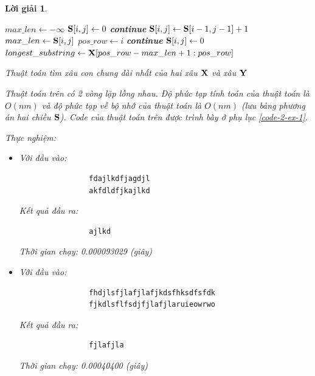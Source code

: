 \documentclass[14pt, a4paper]{article}
\theoremstyle{sltheorem}
\theoremstyle{soltheorem}
\newtheorem*{loigiai}{Lời giải}
\begin{document}
\begin{loigiai}
\begin{itemize} [label={$-$}]
\begin{algorithm}
            $max\_len \gets - \infty$\;
             {
                 {
                     {
                        $\bold{S} \lbrack i, j \rbrack \gets 0$\;
                        \textbf{continue}\;
                    }
                     {
                        $\bold{S} \lbrack i, j \rbrack \gets \bold{S} \lbrack i - 1, j - 1 \rbrack + 1$\;
                         {
                            $max\_len \gets \bold{S} \lbrack i, j \rbrack$\;
                            $pos\_row \gets i$\;
                        }
                        \textbf{continue}\;
                    }
                     {
                        $\bold{S} \lbrack i, j \rbrack \gets 0$\;
                    }
                }
            }
            $longest\_substring \gets \bold{X} \lbrack pos\_row - max\_len + 1: pos\_row \rbrack$\;
            \;
            \caption{Thuật toán tìm xâu con chung dài nhất của hai xâu $\bold{X}$ và xâu $\bold{Y}$}
        \end{algorithm}

        Thuật toán trên có 2 vòng lặp lồng nhau.
        Độ phức tạp tính toán của thuật toán là $O(nm)$ và độ phức tạp về bộ nhớ của thuật toán là $O(nm)$ (lưu bảng phương án hai chiều $\bold{S}$).
        Code của thuật toán trên được trình bày ở phụ lục \ref{code-2-ex-1}.

        Thực nghiệm:

        \begin{itemize}
            \item Với đầu vào:
            \begin{verbatim}
                fdajlkdfjagdjl
                akfdldfjkajlkd
            \end{verbatim}
            Kết quả đầu ra:
            \begin{verbatim}
                ajlkd
            \end{verbatim}
            Thời gian chạy: 0.000093029 (giây)
            \item Với đầu vào:
            \begin{verbatim}
                fhdjlsfjlafjlafjkdsfhksdfsfdk  
                fjkdlsflfsdjfjlafjlaruieowrwo
            \end{verbatim}
            Kết quả đầu ra:
            \begin{verbatim}
                fjlafjla
            \end{verbatim}
            Thời gian chạy: 0.00040400 (giây)
        \end{itemize}


\end{itemize}
\end{loigiai}
\end{document}
